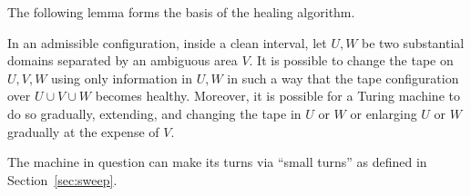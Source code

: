 \documentclass[11pt]{memoir}
\theoremstyle{definition} %
\begin{document}
The following lemma forms the basis of the healing algorithm.

\begin{lemma}[Stitching]\label{lem:stitching}
In an admissible configuration, inside a clean interval,
let \( U,W \) be two substantial domains separated by an ambiguous area \( V \).
It is possible to change the tape on \( U,V,W \) using only information in \( U,W \) in such a 
way that the tape configuration over \( U\cup V\cup W \) becomes healthy.
Moreover, it is possible for a Turing machine to do so gradually, extending,
and changing the tape in \( U \) or \( W \) or enlarging \( U \) or \( W \)
gradually at the expense of \( V \).

The machine in question can make its turns via
``small turns'' as defined in Section~\ref{sec:sweep}.
\end{lemma}
\end{document}
